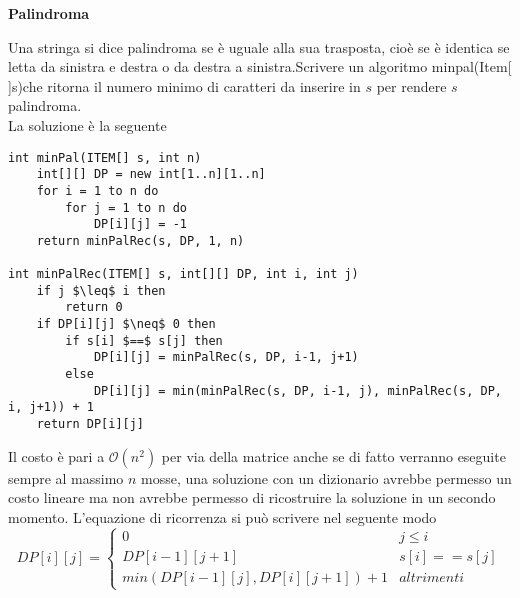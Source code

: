 \documentclass[../cheatSheetAlgoritmi.tex]{subfiles}
\begin{document}
\begin{flushleft}
\textbf{Palindroma}
\end{flushleft}
Una stringa si dice palindroma se è uguale alla sua trasposta, cioè se è identica se letta da sinistra e destra o da destra a sinistra.Scrivere un algoritmo minpal(Item[ ]s)che ritorna il numero minimo di caratteri da inserire in $s$ per rendere $s$ palindroma.\\
La soluzione è la seguente
\begin{lstlisting}[caption=Palindroma]
int minPal(ITEM[] s, int n)
	int[][] DP = new int[1..n][1..n]
    for i = 1 to n do
    	for j = 1 to n do
      		DP[i][j] = -1
    return minPalRec(s, DP, 1, n)

int minPalRec(ITEM[] s, int[][] DP, int i, int j)
	if j $\leq$ i then
		return 0
	if DP[i][j] $\neq$ 0 then
		if s[i] $==$ s[j] then
			DP[i][j] = minPalRec(s, DP, i-1, j+1)
		else
			DP[i][j] = min(minPalRec(s, DP, i-1, j), minPalRec(s, DP, i, j+1)) + 1
	return DP[i][j]	
\end{lstlisting}
Il costo è pari a $\mathcal{O}(n^{2})$ per via della matrice anche se di fatto verranno eseguite sempre al massimo $n$ mosse, una soluzione con un dizionario avrebbe permesso un costo lineare ma non avrebbe permesso di ricostruire la soluzione in un secondo momento. L'equazione di ricorrenza si può scrivere nel seguente modo 
\begin{equation*}
  	DP[i][j] =\begin{cases}
    	0 & \text{$j \leq i$}\\
    	DP[i-1][j+1] & \text{$s[i] == s[j]$}\\
    	min(DP[i-1][j], DP[i][j+1])+1 & \text{$altrimenti$}
  	\end{cases}
\end{equation*}
 
\end{document}
